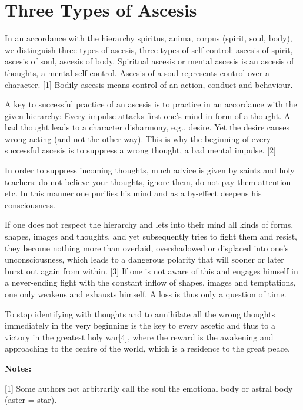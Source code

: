 \section{Three Types of Ascesis}

In an accordance with the hierarchy spiritus, anima, corpus (spirit, soul, body), we distinguish three types of ascesis, three types of self-control: ascesis of spirit, ascesis of soul, ascesis of body. Spiritual ascesis or mental ascesis is an ascesis of thoughts, a mental self-control. Ascesis of a soul represents control over a character. [1] Bodily ascesis means control of an action, conduct and behaviour.

A key to successful practice of an ascesis is to practice in an accordance with the given hierarchy: Every impulse attacks first one's mind in form of a thought. A bad thought leads to a character disharmony, e.g., desire. Yet the desire causes wrong acting (and not the other way). This is why the beginning of every successful ascesis is to suppress a wrong thought, a bad mental impulse. [2]

In order to suppress incoming thoughts, much advice is given by saints and holy teachers: do not believe your thoughts, ignore them, do not pay them attention etc. In this manner one purifies his mind and as a by-effect deepens his consciousness.

If one does not respect the hierarchy and lets into their mind all kinds of forms, shapes, images and thoughts, and yet subsequently tries to fight them and resist, they become nothing more than overlaid, overshadowed or displaced into one's unconsciousness, which leads to a dangerous polarity that will sooner or later burst out again from within. [3] If one is not aware of this and engages himself in a never-ending fight with the constant inflow of shapes, images and temptations, one only weakens and exhausts himself. A loss is thus only a question of time.

To stop identifying with thoughts and to annihilate all the wrong thoughts immediately in the very beginning is the key to every ascetic and thus to a victory in the greatest holy war[4], where the reward is the awakening and approaching to the centre of the world, which is a residence to the great peace.


\hfill

\textbf{Notes:}

[1] Some authors not arbitrarily call the soul the emotional body or astral body (aster = star).

